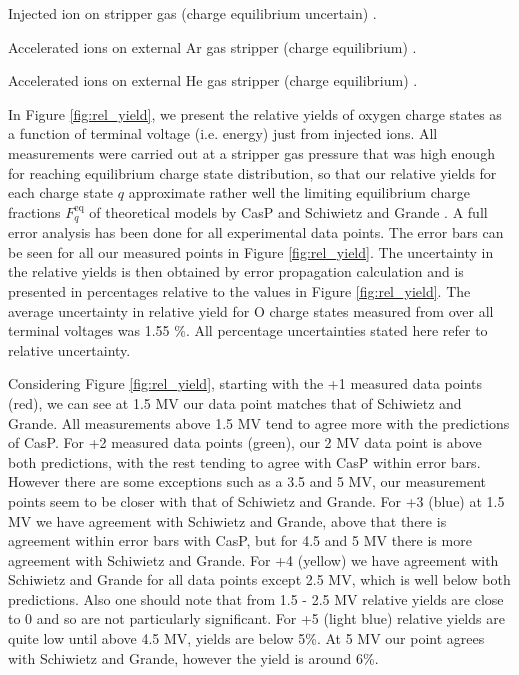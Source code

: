 \documentclass[a4paper,fleqn,review]{cas-sc}
\begin{document}
\begin{table}[h!]
\begin{threeparttable}
\begin{tabular}{c c c c c c c c c c}
				\bottomrule
			\end{tabular}			
			\begin{tablenotes}
				\footnotesize
				\item[1] Injected ion  on  stripper gas (charge equilibrium uncertain) \cite{preikschat1966charge}.
				\item[2] Accelerated  ions on external Ar gas stripper (charge equilibrium) \cite{Hubbard1955}.
				\item[3] Accelerated  ions on external He gas stripper (charge equilibrium) \cite{Liu2014}.
			\end{tablenotes}			
	\end{threeparttable}
\end{table}

In Figure \ref{fig:rel_yield}, we present the relative yields of oxygen charge states as a function of terminal voltage (i.e. energy)  just from injected  ions. All measurements were carried out at a stripper gas pressure that was high enough for reaching  equilibrium charge state distribution, so that our relative yields for each charge state $q$ approximate rather well the limiting equilibrium charge fractions $F_q^\text{eq}$ of theoretical models by CasP and Schiwietz and Grande \cite{schiwietz2001improved}. 
A full error analysis has been done for all experimental data points. The error bars can be seen for all our measured points in Figure \ref{fig:rel_yield}.  The uncertainty in the relative yields is then obtained by error propagation calculation and is presented in percentages relative to the values in Figure \ref{fig:rel_yield}. 
The average uncertainty in relative yield for O charge states measured from  over all terminal voltages was 1.55 \%. All percentage uncertainties stated here refer to relative uncertainty.

Considering Figure \ref{fig:rel_yield}, starting with the +1 measured data points (red), we can see at 1.5 MV our data point matches that of Schiwietz and Grande. All measurements above 1.5 MV tend to agree more with the predictions of CasP. For +2 measured data points (green), our 2 MV data point is above both predictions, with the rest tending to agree with CasP within error bars. However there are some exceptions such as a 3.5 and 5 MV, our measurement points seem to be closer with that of  Schiwietz and Grande. For +3 (blue) at 1.5 MV we have agreement with Schiwietz and Grande, above that there is agreement within error bars with CasP, but for 4.5 and 5 MV there is more agreement with Schiwietz and Grande. For +4 (yellow) we have agreement with Schiwietz and Grande for all data points except 2.5 MV, which is well below both predictions. Also one should note that from 1.5 - 2.5 MV relative yields are close to 0 and so are not particularly significant. For +5 (light blue) relative yields are quite low until above 4.5 MV, yields are below 5\%. At 5 MV our point agrees with Schiwietz and Grande, however the yield is around 6\%.
\end{document}
